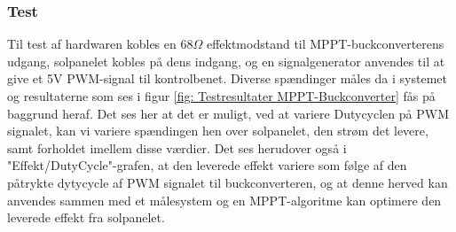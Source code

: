 \documentclass[../main.tex]{subfiles}
\begin{document}
        \subsubsection{Test}
            Til test af hardwaren kobles en $68\Omega$ effektmodstand til MPPT-buckconverterens udgang, solpanelet kobles på dens indgang, og en signalgenerator anvendes til at give et 5V PWM-signal til kontrolbenet. Diverse spændinger måles da i systemet og resultaterne som ses i figur \ref{fig: Testresultater MPPT-Buckconverter} fås på baggrund heraf.\newline
            Det ses her at det er muligt, ved at variere Dutycyclen på PWM signalet, kan vi variere spændingen hen over solpanelet, den strøm det levere, samt forholdet imellem disse værdier. Det ses herudover også i "Effekt/DutyCycle"-grafen, at den leverede effekt variere som følge af den påtrykte dytycycle af PWM signalet til buckconverteren, og at denne herved kan anvendes sammen med et målesystem og en MPPT-algoritme kan optimere den leverede effekt fra solpanelet.
            
\end{document}
